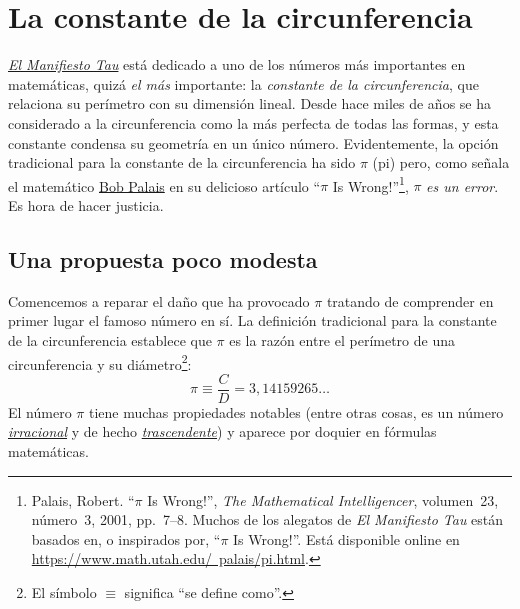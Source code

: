 
\section{La constante de la circunferencia} %
\label{sec:the_circle_constant}

\href{http://tauday.com/el-manifiesto-tau}{\emph{El Manifiesto Tau}} está dedicado a uno de los números más importantes en matemáticas, quizá \emph{el más} importante: la \emph{constante de la circunferencia}, que relaciona su perímetro con su dimensión lineal. Desde hace miles de años se ha considerado a la circunferencia como la más perfecta de todas las formas, y esta constante condensa su geometría en un único número. Evidentemente, la opción tradicional para la constante de la circunferencia ha sido $\pi$ (pi) pero, como señala el matemático \href{http://www.math.utah.edu/~palais}{Bob Palais} en su delicioso artículo ``$\pi$ Is Wrong!''\footnote{Palais, Robert. ``$\pi$ Is Wrong!'', \emph{The Mathematical Intelligencer}, volumen~23, número~3, 2001, pp.~7--8. Muchos de los alegatos de \emph{El Manifiesto Tau} están basados en, o inspirados por, ``$\pi$ Is Wrong!''. Está disponible online en \href{https://www.math.utah.edu/~palais/pi.html}{https://www.math.utah.edu/~palais/pi.html}.}, $\pi$ \emph{es un error}. Es hora de hacer justicia.

  \subsection{Una propuesta poco modesta} %
  \label{sec:an_immodest_proposal}

Comencemos a reparar el daño que ha provocado $\pi$ tratando de comprender en primer lugar el famoso número en sí. La definición tradicional para la constante de la circunferencia establece que $\pi$ es la razón entre el perímetro de una circunferencia y su diámetro\footnote{El símbolo $\equiv$ significa ``se define como''.}:
\begin{equation}
\label{eq:pi}
\pi \equiv \frac{C}{D} = 3{,}14159265\ldots
\end{equation}
El número $\pi$ tiene muchas propiedades notables (entre otras cosas, es un número \href{https://es.wikipedia.org/wiki/Número_irracional}{\emph{irracional}} y de hecho \href{https://es.wikipedia.org/wiki/Número_trascendente}{\emph{trascendente}}) y aparece por doquier en fórmulas matemáticas.

